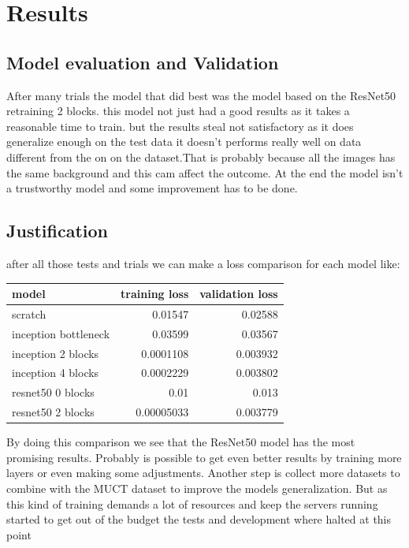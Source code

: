 \documentclass[11pt]{article}
\begin{document}
\section{Results}
\label{sec:org206d1d0}

\subsection{Model evaluation and Validation}
\label{sec:orgfc837ac}
After many trials the model that did best was the model based on the ResNet50
retraining 2 blocks. this model not just had a good results as it takes a
reasonable time to train. but the results steal not satisfactory as it does
generalize enough on the test data it doesn't performs really well on data
different from the on on the dataset.That is probably because all the images
has the same background and this cam affect the outcome.
At the end the model isn't a trustworthy model and some improvement has to be
done. 




\subsection{Justification}
\label{sec:org814b232}

after all those tests and trials we can make a loss comparison for each model
like:

\begin{center}
\begin{tabular}{lrr}
model & training loss & validation loss\\
\hline
scratch & 0.01547 & 0.02588\\
inception bottleneck & 0.03599 & 0.03567\\
inception 2 blocks & 0.0001108 & 0.003932\\
inception 4 blocks & 0.0002229 & 0.003802\\
resnet50 0 blocks & 0.01 & 0.013\\
resnet50 2 blocks & 0.00005033 & 0.003779\\
\end{tabular}
\end{center}

By doing this comparison we see that the ResNet50 model has the most
promising results.
Probably is possible to get even better results by training more layers or
even making some adjustments.
Another step is collect more datasets to combine with the MUCT dataset to
improve the models generalization.
But as this kind of training demands a lot of resources and keep the servers running started to get out of the budget the
tests and development where halted at this point 
\end{document}
